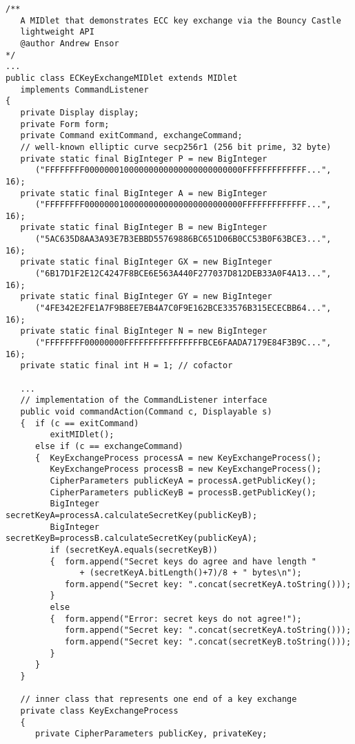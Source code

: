 \begin{lstlisting}[caption=ECC key exchange via the Bouncy Castle]
/**
   A MIDlet that demonstrates ECC key exchange via the Bouncy Castle
   lightweight API
   @author Andrew Ensor
*/
...
public class ECKeyExchangeMIDlet extends MIDlet
   implements CommandListener
{
   private Display display;
   private Form form;
   private Command exitCommand, exchangeCommand;
   // well-known elliptic curve secp256r1 (256 bit prime, 32 byte)
   private static final BigInteger P = new BigInteger
      ("FFFFFFFF00000001000000000000000000000000FFFFFFFFFFFFF...", 16);
   private static final BigInteger A = new BigInteger
      ("FFFFFFFF00000001000000000000000000000000FFFFFFFFFFFFF...", 16);
   private static final BigInteger B = new BigInteger
      ("5AC635D8AA3A93E7B3EBBD55769886BC651D06B0CC53B0F63BCE3...", 16);
   private static final BigInteger GX = new BigInteger
      ("6B17D1F2E12C4247F8BCE6E563A440F277037D812DEB33A0F4A13...", 16);
   private static final BigInteger GY = new BigInteger
      ("4FE342E2FE1A7F9B8EE7EB4A7C0F9E162BCE33576B315ECECBB64...", 16);
   private static final BigInteger N = new BigInteger
      ("FFFFFFFF00000000FFFFFFFFFFFFFFFFBCE6FAADA7179E84F3B9C...", 16);
   private static final int H = 1; // cofactor

   ...
   // implementation of the CommandListener interface
   public void commandAction(Command c, Displayable s)
   {  if (c == exitCommand)
         exitMIDlet();
      else if (c == exchangeCommand)
      {  KeyExchangeProcess processA = new KeyExchangeProcess();
         KeyExchangeProcess processB = new KeyExchangeProcess();
         CipherParameters publicKeyA = processA.getPublicKey();
         CipherParameters publicKeyB = processB.getPublicKey();
         BigInteger secretKeyA=processA.calculateSecretKey(publicKeyB);
         BigInteger secretKeyB=processB.calculateSecretKey(publicKeyA);
         if (secretKeyA.equals(secretKeyB))
         {  form.append("Secret keys do agree and have length "
               + (secretKeyA.bitLength()+7)/8 + " bytes\n");
            form.append("Secret key: ".concat(secretKeyA.toString()));
         }
         else
         {  form.append("Error: secret keys do not agree!");
            form.append("Secret key: ".concat(secretKeyA.toString()));
            form.append("Secret key: ".concat(secretKeyB.toString()));
         }
      }
   }

   // inner class that represents one end of a key exchange
   private class KeyExchangeProcess
   {
      private CipherParameters publicKey, privateKey;


\end{lstlisting}
